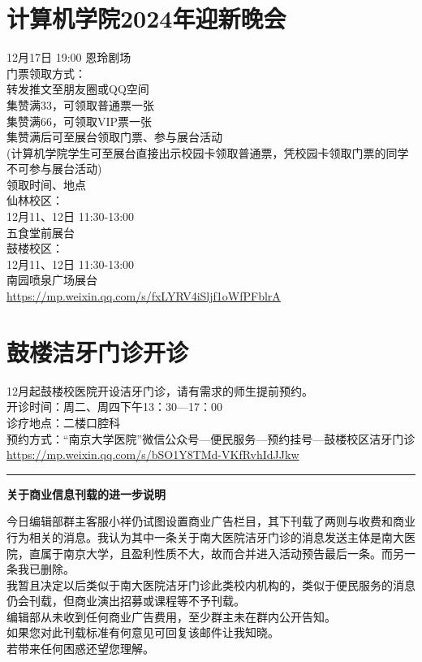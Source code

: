\documentclass[letterpaper, 12pt]{article}
\begin{document}
\begin{multicols}{2}
\section{计算机学院2024年迎新晚会}
12月17日 19:00 恩玲剧场\\
门票领取方式：\\
转发推文至朋友圈或QQ空间\\
集赞满33，可领取普通票一张\\
集赞满66，可领取VIP票一张\\
集赞满后可至展台领取门票、参与展台活动\\
(计算机学院学生可至展台直接出示校园卡领取普通票，凭校园卡领取门票的同学不可参与展台活动)\\
领取时间、地点\\
仙林校区：\\
12月11、12日 11:30-13:00\\
五食堂前展台\\
鼓楼校区：\\
12月11、12日 11:30-13:00\\
南园喷泉广场展台\\
\url{https://mp.weixin.qq.com/s/fxLYRV4iSljf1oWfPFblrA}
\section{鼓楼洁牙门诊开诊}
12月起鼓楼校医院开设洁牙门诊，请有需求的师生提前预约。\\
开诊时间：周二、周四下午13：30—17：00\\
诊疗地点：二楼口腔科\\
预约方式：“南京大学医院”微信公众号—便民服务—预约挂号—鼓楼校区洁牙门诊\\
\url{https://mp.weixin.qq.com/s/bSO1Y8TMd-VKfRvhIdJJkw}
\end{multicols} 
\hrule
\vspace{4mm}
\centerline{\huge\textbf{关于商业信息刊载的进一步说明}}
\begin{multicols}{2}
今日编辑部群主客服小祥仍试图设置商业广告栏目，其下刊载了两则与收费和商业行为相关的消息。我认为其中一条关于南大医院洁牙门诊的消息发送主体是南大医院，直属于南京大学，且盈利性质不大，故而合并进入活动预告最后一条。而另一条我已删除。\\我暂且决定以后类似于南大医院洁牙门诊此类校内机构的，类似于便民服务的消息仍会刊载，但商业演出招募或课程等不予刊载。\\编辑部从未收到任何商业广告费用，至少群主未在群内公开告知。\\如果您对此刊载标准有何意见可回复该邮件让我知晓。\\若带来任何困惑还望您理解。
\end{multicols} 
\end{document}
